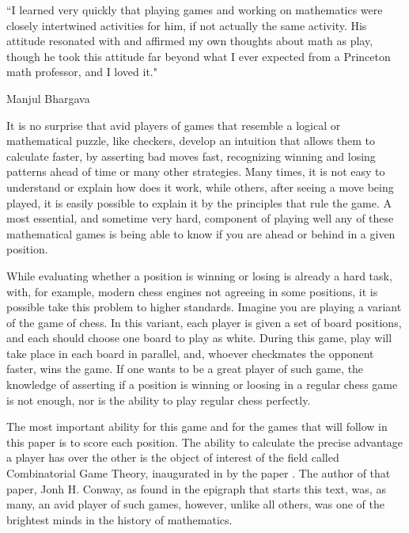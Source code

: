 \renewcommand{\textflush}{flushepinormal}
\setlength{}
\epigraph{``I learned very quickly that playing games and working on mathematics were closely intertwined activities for him, if not actually the same activity. His attitude resonated with and affirmed my own thoughts about math as play, though he took this attitude far beyond what I ever expected from a Princeton math professor, and I loved it."}{Manjul Bhargava \footnotemark}


It is no surprise that avid players of games that resemble a logical or mathematical puzzle, like checkers, develop an intuition that allows them to calculate faster, by asserting bad moves fast, recognizing winning and losing patterns ahead of time or many other strategies. Many times, it is not easy to understand or explain how does it work, while others, after seeing a move being played, it is easily possible to explain it by the principles that rule the game. A most essential, and sometime very hard, component of playing well any of these mathematical games is being able to know if you are ahead or behind in a given position.

While evaluating whether a position is winning or losing is already a hard task, with, for example, modern chess engines not agreeing in some positions, it is possible take this problem to higher standards. Imagine you are playing a variant of the game of chess. In this variant, each player is given a set of board positions, and each should choose one board to play as white. During this game, play will take place in each board in parallel, and, whoever checkmates the opponent faster, wins the game. If one wants to be a great player of such game, the knowledge of asserting if a position is winning or loosing in a regular chess game is not enough, nor is the ability to play regular chess perfectly.

The most important ability for this game and for the games that will follow in this paper is to score each position. The ability to calculate the precise advantage a player has over the other is the object of interest of the field called Combinatorial Game Theory, inaugurated in  by the paper . The author of that paper, Jonh H. Conway, as found in the epigraph that starts this text, was, as many, an avid player of such games, however, unlike all others, was one of the brightest minds in the history of mathematics.

